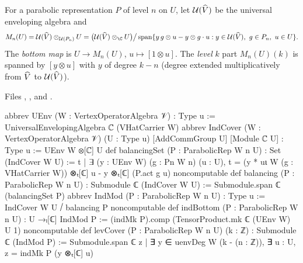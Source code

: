 \begin{definition}\label{l13:def:indmod}
For a parabolic representation $P$ of level $n$ on $U$, let $\mathcal{U}(\widehat{V})$ be the universal enveloping algebra
and
\begin{equation*}
 M_n(U) = \lthirteenUE(\lthirteenVh)\otimes_{\lthirteenUE(P_n)}U
 = \bigl(\lthirteenUE(\lthirteenVh)\otimes_\C U\bigr)\big/\operatorname{span}\{y\,g\otimes u - y\otimes g\cdot u :
 y\in\lthirteenUE(\lthirteenVh),\ g\in P_n,\ u\in U\}.
\end{equation*}
The \emph{bottom map} is $U\to M_n(U)$, $u\mapsto[1\otimes u]$. The \emph{level} $k$ part $M_n(U)(k)$ is spanned by
$[y\otimes u]$ with $y$ of degree $k-n$ (degree extended multiplicatively from $\widehat{V}$ to $\mathcal{U}(\widehat{V})$).
\end{definition}
\noindent Files ,
,
 and
.
\begin{leancode}
abbrev UEnv (W : VertexOperatorAlgebra 𝒱) : Type u :=
  UniversalEnvelopingAlgebra ℂ (VHatCarrier W)
abbrev IndCover (W : VertexOperatorAlgebra 𝒱) (U : Type u) [AddCommGroup U] [Module ℂ U] :
    Type u := UEnv W ⊗[ℂ] U
def balancingSet (P : ParabolicRep W n U) : Set (IndCover W U) :=
  {t | ∃ (y : UEnv W) (g : Pn W n) (u : U),
    t = (y * uι W (g : VHatCarrier W)) ⊗ₜ[ℂ] u - y ⊗ₜ[ℂ] (P.act g u)}
noncomputable def balancing (P : ParabolicRep W n U) : Submodule ℂ (IndCover W U) :=
  Submodule.span ℂ (balancingSet P)
abbrev IndMod (P : ParabolicRep W n U) : Type u := IndCover W U ⧸ balancing P
noncomputable def indBottom (P : ParabolicRep W n U) : U →ₗ[ℂ] IndMod P :=
  (indMk P).comp (TensorProduct.mk ℂ (UEnv W) U 1)
noncomputable def levCover (P : ParabolicRep W n U) (k : ℤ) : Submodule ℂ (IndMod P) :=
  Submodule.span ℂ {z | ∃ y ∈ uenvDeg W (k - (n : ℤ)), ∃ u : U, z = indMk P (y ⊗ₜ[ℂ] u)}
\end{leancode}

